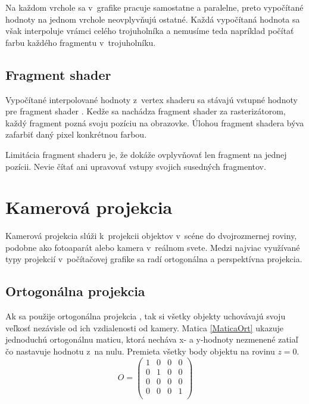 Na každom vrchole sa v~grafike pracuje samostatne a paralelne, preto vypočítané hodnoty na jednom vrchole neovplyvňujú ostatné. Každá vypočítaná hodnota sa však interpoluje vrámci celého trojuholníka a nemusíme teda napríklad počítať farbu každého fragmentu v~trojuholníku.

\subsection*{Fragment shader}
Vypočítané interpolované hodnoty z~vertex shaderu sa stávajú vstupné hodnoty pre fragment shader \cite{RTRend}. Kedže sa nachádza fragment shader za rasterizátorom, každý fragment pozná svoju pozíciu na obrazovke. Úlohou fragment shadera býva zafarbiť daný pixel konkrétnou farbou.

Limitácia fragment shaderu je, že dokáže ovplyvňovať len fragment na jednej pozícii. Nevie čítať ani upravovať vstupy svojich susedných fragmentov.

\section{Kamerová projekcia}
\label{KameraTeoria}
Kamerová projekcia \cite{transf&proj} slúži k~projekcii objektov v~scéne do dvojrozmernej roviny, podobne ako fotoaparát alebo kamera v~reálnom svete. Medzi najviac využívané typy projekcií v~počítačovej grafike sa radí ortogonálna a perspektívna projekcia.

\subsection*{Ortogonálna projekcia}

Ak sa použije ortogonálna projekcia \cite{RTRend}, tak si všetky objekty uchovávajú svoju veľkosť nezávisle od ich vzdialenosti od kamery. Matica \ref{MaticaOrt} ukazuje jednoduchú ortogonálnu maticu, ktorá necháva x- a y-hodnoty nezmenené zatiaľ čo nastavuje hodnotu z~na nulu. Premieta všetky body objektu na rovinu $z = 0$.
\begin{equation} \label{MaticaOrt}
    O = 
    \begin{pmatrix}
    1 & 0 & 0 & 0\\
    0 & 1 & 0 & 0\\
    0 & 0 & 0 & 0\\
    0 & 0 & 0 & 1\\
    \end{pmatrix}
\end{equation}

